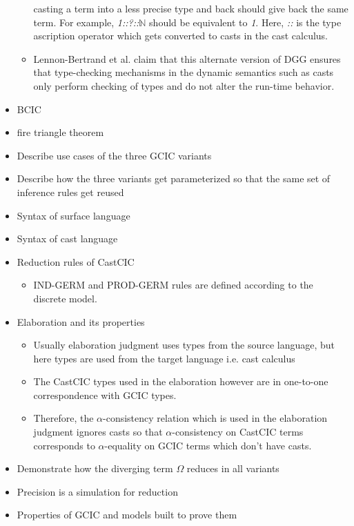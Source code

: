 \documentclass{article}
\theoremstyle{definition}
\newcommand{\Gcode}[1]{{\color{OliveGreen}\textit{#1}}}
\newcommand{\Ccode}[1]{{\color{BlueViolet}\textbf{#1}}}
\begin{document}
\begin{itemize}
\begin{itemize}
        casting a term into a less precise type and back should give back the same
        term. For example, \Gcode{1::?::\(\mathbb{N}\)} should be equivalent to
        \Gcode{1}. Here, \Gcode{::} is the type ascription operator which gets
        converted to casts in the cast calculus.
      \item Lennon-Bertrand et al. claim that this alternate version of DGG ensures
        that type-checking mechanisms in the dynamic semantics such as casts only
        perform checking of types and do not alter the run-time behavior.
    \end{itemize}
  \item BCIC
  \item fire triangle theorem
  \item Describe use cases of the three GCIC variants
  \item Describe how the three variants get parameterized so that the same set
    of inference rules get reused
  \item Syntax of surface language
  \item Syntax of cast language
  \item Reduction rules of CastCIC
    \begin{itemize}
      \item IND-GERM and PROD-GERM rules are defined according to the discrete model.
    \end{itemize}
  \item Elaboration and its properties
    \begin{itemize}
      \item Usually elaboration judgment uses types from the source language,
        but here types are used from the target language i.e. cast calculus
      \item The CastCIC types used in the elaboration however are in one-to-one
        correspondence with GCIC types.
      \item Therefore, the \(\alpha\)-consistency relation which is used in the
        elaboration judgment ignores casts so that \(\alpha\)-consistency on
        CastCIC terms corresponds to \(\alpha\)-equality on GCIC terms which
        don't have casts.
    \end{itemize}
  \item Demonstrate how the diverging term \Ccode{\(\Omega\)} reduces in all
    variants
  \item Precision is a simulation for reduction
  \item Properties of GCIC and models built to prove them
\end{itemize}
\end{document}
